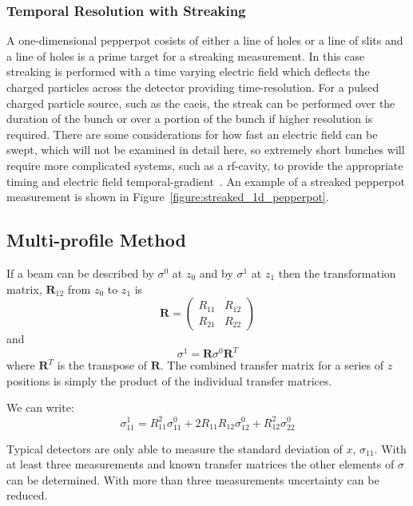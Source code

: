 \subsubsection{Temporal Resolution with Streaking}
A one-dimensional pepperpot cosists of either a line of holes or a line of slits and a line of holes is a prime target for a streaking measurement.
In this case streaking is performed with a time varying electric field which deflects the charged particles across the detector providing time-resolution.
For a pulsed charged particle source, such as the \gls{caeis}, the streak can be performed over the duration of the bunch or over a portion of the bunch if higher resolution is required.
There are some considerations for how fast an electric field can be swept, which will not be examined in detail here, so extremely short bunches will require more complicated systems, such as a rf-cavity, to provide the appropriate timing and electric field temporal-gradient~\cite{alesini_rf_2006}.
An example of a streaked pepperpot measurement is shown in Figure~\ref{figure:streaked_1d_pepperpot}.

\subsection{Multi-profile Method}

If a beam can be described by $\sigma^0$ at $z_0$ and by $\sigma^1$ at $z_1$ then the transformation matrix, $\mathbf{R}_{12}$ from $z_0$ to $z_1$ is
\begin{equation}
\mathbf{R} = \begin{pmatrix} R_{11} & R_{12} \\ R_{21} & R_{22} \end{pmatrix}
\end{equation}
and
\begin{equation}
\sigma^1 = \mathbf{R}\sigma^0\mathbf{R}^T
\end{equation}
where $\mathbf{R}^T$ is the transpose of $\mathbf{R}$.
The combined transfer matrix for a series of $z$ positions is simply the product of the individual transfer matrices.

We can write:
\begin{equation}\label{equation:multiprofile}
\sigma_{11}^1 = R_{11}^2\sigma_{11}^0 + 2R_{11}R_{12}\sigma_{12}^0 + R_{12}^2\sigma_{22}^0
\end{equation}

Typical detectors are only able to measure the standard deviation of $x$, $\sigma_{11}$.
With at least three measurements and known transfer matrices the other elements of $\sigma$ can be determined.
With more than three measurements uncertainty can be reduced.

